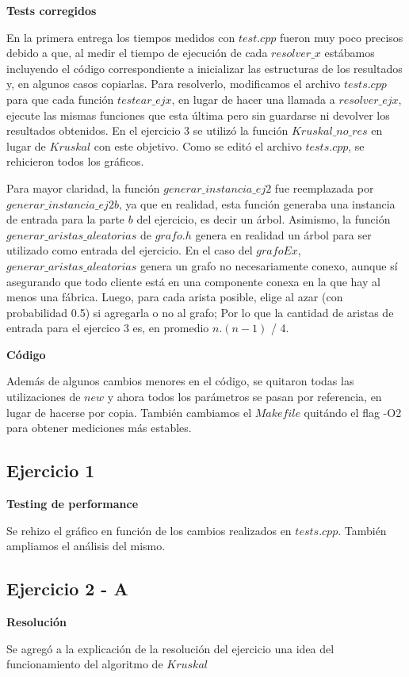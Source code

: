 \documentclass[10pt,a4paper]{article}
\begin{document}
\textbf{Tests corregidos}
\par{En la primera entrega los tiempos medidos con $test.cpp$ fueron muy poco
precisos debido a que, al medir el tiempo de ejecución de cada $resolver\_x$
estábamos incluyendo el código correspondiente a inicializar las estructuras de
los resultados y, en algunos casos copiarlas. Para resolverlo, modificamos
el archivo $tests.cpp$ para que cada función $testear\_ejx$, en lugar de hacer
una llamada a $resolver\_ejx$, ejecute las mismas funciones que esta última
pero sin guardarse ni devolver los resultados obtenidos. En el ejercicio 3
se utilizó la función $Kruskal\_no\_res$ en lugar de $Kruskal$ con este
objetivo. Como se editó el archivo $tests.cpp$, se rehicieron todos los
gráficos.}
\par{Para mayor claridad, la función $generar\_instancia\_ej2$ fue reemplazada
por $generar\_instancia\_ej2b$, ya que en realidad, esta función generaba una
instancia de entrada para la parte $b$ del ejercicio, es decir un árbol.
Asimismo, la función $generar\_aristas\_aleatorias$ de $grafo.h$ genera en
realidad un árbol para ser utilizado como entrada del ejercicio. En el caso del
$grafoEx$, $generar\_aristas\_aleatorias$ genera un grafo no necesariamente
conexo, aunque sí asegurando que todo cliente está en una componente conexa
en la que hay al menos una fábrica. Luego, para cada arista posible, elige
al azar (con probabilidad 0.5) si agregarla o no al grafo; Por lo que la
cantidad de aristas de entrada para el ejercico 3 es, en promedio $n.(n-1)$ / 4.}

\textbf{Código}
\par{Además de algunos cambios menores en el código, se quitaron todas las
utilizaciones de $new$ y ahora todos los parámetros se pasan por referencia,
en lugar de hacerse por copia. También cambiamos el $Makefile$ quitándo el
flag -O2 para obtener mediciones más estables.}
\subsection{Ejercicio 1}
\textbf{Testing de performance}
\par{Se rehizo el gráfico en función de los cambios realizados en $tests.cpp$.
También ampliamos el análisis del mismo.}
\subsection{Ejercicio 2 - A}
\textbf{Resolución}
\par{Se agregó a la explicación de la resolución del ejercicio una idea del
funcionamiento del algoritmo de $Kruskal$}
\end{document}
